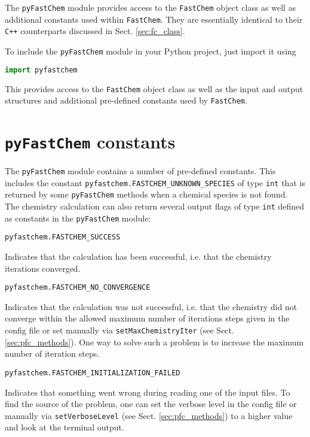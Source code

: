 \documentclass[numbers=noenddot]{aux/fcmanual}
\newcommand{\fc}{\texttt{FastChem}\xspace}
\newcommand{\pfc}{\texttt{pyFastChem}\xspace}
\newcommand{\cpp}{\ttt{C++}\xspace}
\newcommand{\ttt}[1]{\texttt {#1}}
\begin{document}
The \pfc module provides access to the \fc object class as well as additional constants used within \fc. They are essentially identical to their \cpp counterparts discussed in Sect. \ref{sec:fc_class}.

To include the \pfc module in your Python project, just import it using

\begin{lstlisting}[language=Python]
  import pyfastchem
\end{lstlisting}

This provides access to the \fc object class as well as the input and output structures and additional pre-defined constants used by \fc.

\section{\pfc constants}
\label{sec:pfc_constants}

The \pfc module contains a number of pre-defined constants. This includes the constant \lstinline!pyfastchem.FASTCHEM_UNKNOWN_SPECIES! of type \lstinline!int! that is returned by some \pfc methods when a chemical species is not found. \\

The chemistry calculation can also return several output flags of type \lstinline!int! defined as constants in the \pfc module:

\lstinline!pyfastchem.FASTCHEM_SUCCESS!
\begin{addmargin}[25pt]{0pt}
  Indicates that the calculation has been successful, i.e. that the chemistry iterations converged.
\end{addmargin}
  
\bigbreak
  
\lstinline!pyfastchem.FASTCHEM_NO_CONVERGENCE!
\begin{addmargin}[25pt]{0pt}
  Indicates that the calculation was not successful, i.e. that the chemistry did not converge within the allowed maximum number of iterations steps given in the config file or set manually via \lstinline!setMaxChemistryIter! (see Sect. \ref{sec:pfc_methods}). One way to solve such a problem is to increase the maximum number of iteration steps.
\end{addmargin}
    
\bigbreak
    
\lstinline!pyfastchem.FASTCHEM_INITIALIZATION_FAILED!
\begin{addmargin}[25pt]{0pt}
  Indicates that something went wrong during reading one of the input files. To find the source of the problem, one can set the verbose level in the config file or manually via \lstinline!setVerboseLevel! (see Sect. \ref{sec:pfc_methods}) to a higher value and look at the terminal output.
\end{addmargin}
      
\end{document}
